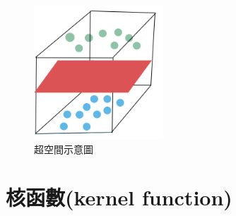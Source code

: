 \begin{figure}[H]
	\centerline{\includegraphics[height=5cm]{pic/over space.PNG}}
	\caption{超空間示意圖}
	\label{fig:Hyperspace}
\end{figure}
\label{sec:background}

\section{核函數(kernel function)}
